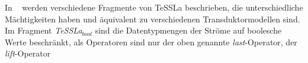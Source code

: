 In ~\cite{TeSSLa} werden verschiedene Fragmente von TeSSLa beschrieben, die unterschiedliche Mächtigkeiten haben und äquivalent zu verschiedenen Transduktormodellen sind. Im Fragment \emph{TeSSLa$_{bool}$} sind die Datentypmengen der Ströme auf boolesche Werte beschränkt, als Operatoren sind nur der oben genannte \emph{last}-Operator, der \emph{lift}-Operator